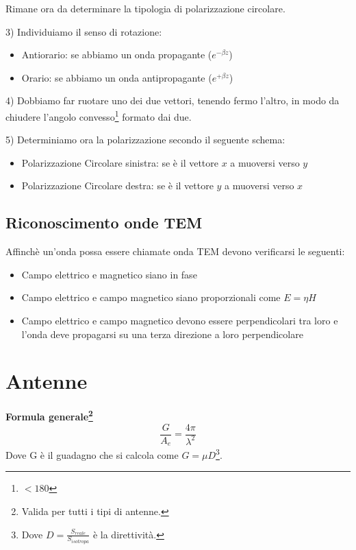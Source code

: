 \documentclass[10pt,a4paper]{report}
\begin{document}
	Rimane ora da determinare la tipologia di polarizzazione circolare.
	
	\raggedright{3) Individuiamo il senso di rotazione:}

	\begin{itemize}

	\item Antiorario: se abbiamo un onda propagante ($e^{-\beta z}$)
	\item Orario: se abbiamo un onda antipropagante ($e^{+\beta z}$)

	\end{itemize}
	\raggedright{4) Dobbiamo far ruotare uno dei due vettori, tenendo fermo l'altro, in modo da chiudere l'angolo convesso\footnote{$<180$} formato dai due.}

	\raggedright{	5) Determiniamo ora la polarizzazione secondo il seguente schema:}

	\begin{itemize}
	\item Polarizzazione Circolare sinistra: se è il vettore $x$ a muoversi verso $y$ 
	\item Polarizzazione Circolare destra: se è il vettore $y$ a muoversi verso $x$ 
	\end{itemize}	


	\section{Riconoscimento onde TEM}
	Affinchè un'onda possa essere chiamate onda TEM devono verificarsi le seguenti:

	\begin{itemize}

	\item Campo elettrico e magnetico siano in fase 

	\item Campo elettrico e campo magnetico siano proporzionali come $E=\eta H$

	\item Campo elettrico e campo magnetico devono essere perpendicolari tra loro e l'onda deve propagarsi su una terza direzione a loro perpendicolare

	\end{itemize}

\chapter{Antenne}
		\textbf{Formula generale\footnote{Valida per tutti i tipi di antenne.}}
		\begin{equation}
		\frac{G}{A_e}=\frac{4\pi}{\lambda^2}
		\end{equation}
	    Dove G è il guadagno che si calcola come $G=\mu D$\footnote{Dove $D=\frac{S_{reale}}{S_{isotropa}}$ è la direttività.}.
\end{document}
